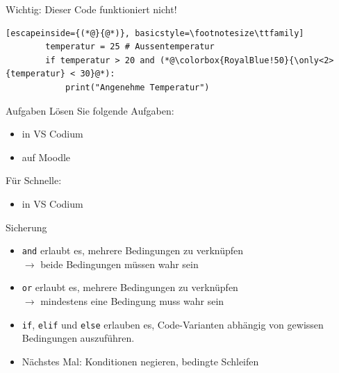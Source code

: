 \begin{frame}[fragile]{Wichtig: Dieser Code funktioniert nicht!}

    \begin{lstlisting}[escapeinside={(*@}{@*)}, basicstyle=\footnotesize\ttfamily]
        temperatur = 25 # Aussentemperatur
        if temperatur > 20 and (*@\colorbox{RoyalBlue!50}{\only<2>{temperatur} < 30}@*):
            print("Angenehme Temperatur")
    \end{lstlisting}
\end{frame}


\begin{frame}{Aufgaben}
    Lösen Sie folgende Aufgaben:
    \begin{itemize}
        \item {} in VS Codium
        \item {} auf Moodle
    \end{itemize}
    
    Für Schnelle:
    \begin{itemize}
        \item {} in VS Codium
    \end{itemize}
\end{frame}

\begin{frame}{Sicherung}
    \begin{itemize}[<+->]
        \item \faCheckSquare{} \lstinline|and| erlaubt es, mehrere Bedingungen zu verknüpfen\\
        $\rightarrow$ beide Bedingungen müssen wahr sein
        \item \faCheckSquare{} \lstinline|or| erlaubt es, mehrere Bedingungen zu verknüpfen\\
        $\rightarrow$ mindestens eine Bedingung muss wahr sein
        \item \faCheckSquare{} \lstinline|if|, \lstinline|elif| und \lstinline|else| erlauben es, Code-Varianten abhängig von gewissen Bedingungen auszuführen.
        \item \faSquare{} Nächstes Mal: Konditionen negieren, bedingte Schleifen
    \end{itemize}
\end{frame}
